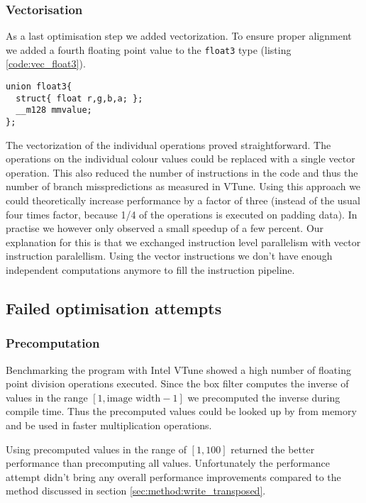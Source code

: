 \subsubsection{Vectorisation}
As a last optimisation step we added vectorization. To ensure proper alignment we added a fourth floating point value to the \lstinline{float3} type (listing \ref{code:vec_float3}).
\begin{lstlisting}[label=Vectorised float3 type, label=code:vec_float3] 
union float3{
  struct{ float r,g,b,a; };
  __m128 mmvalue;
};
\end{lstlisting}
The vectorization of the individual operations proved straightforward. The operations on the individual colour values could be replaced with a single vector operation. This also reduced the number of instructions in the code and thus the number of branch misspredictions as measured in VTune. Using this approach we could theoretically increase performance by a factor of three (instead of the usual four times factor, because 1/4 of the operations is executed on padding data). In practise we however only observed a small speedup of a few percent. Our explanation for this is that we exchanged instruction level parallelism with vector instruction paralellism. Using the vector instructions we don't have enough independent computations anymore to fill the instruction pipeline.

\subsection{Failed optimisation attempts}

\subsubsection{Precomputation} 

Benchmarking the program with Intel VTune showed a high number of floating point division operations executed. Since the box filter computes the inverse of values in the range $[1,\text{image width}-1]$ we precomputed the inverse during compile time. Thus the precomputed values could be looked up by from memory and be used in faster multiplication operations.

Using precomputed values in the range of $[1,100]$ returned the better performance than precomputing all values. Unfortunately the performance attempt didn't bring any overall performance improvements compared to the method discussed in section \ref{sec:method:write_transposed}.

